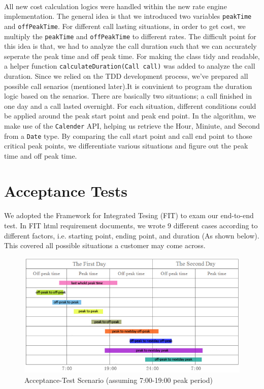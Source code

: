 \documentclass[a4paper,12pt,oneside,final]{article}
\newenvironment{changemargin}[2]{\begin{list}{}{%
\setlength{\topsep}{0pt}%
\setlength{\leftmargin}{0pt}%
\setlength{\rightmargin}{0pt}%
\setlength{\listparindent}{\parindent}%
\setlength{\itemindent}{\parindent}%
\setlength{\parsep}{0pt plus 1pt}%
\addtolength{\leftmargin}{#1}%
\addtolength{\rightmargin}{#2}%
}\item }{\end{list}}
\begin{document}
\paragraph{}
All new cost calculation logics were handled within the new rate engine implementation. The general idea is that we introduced two variables \verb+peakTime+ and \verb+offPeakTime+. For different call lasting situations, in order to get cost, we multiply the \verb+peakTime+ and \verb+offPeakTime+ to different rates. The difficult point for this idea is that, we had to analyze the call duration such that we can accurately seperate  the peak time and off peak time. For making the class tidy and readable, a helper function \verb+calculateDuration(Call call)+ was added to analyze the call duration. Since we relied on the TDD development process, we've prepared all possible call senarios (mentioned later).It is convinient to program the duration logic based on the senarios. There are basically two situations; a call finished in one day and a call lasted overnight. For each situation, different conditions could be applied around the peak start point and peak end point. In the algorithm, we make use of the \verb+Calender+ API, helping us retrieve the Hour, Miniute, and Second from a \verb+Date+ type.  By comparing the call start point and call end point to those critical peak points, we differentiate various situations and figure out the peak time and off peak time.


\section{Acceptance Tests} %
\paragraph{}
We adopted the Framework for Integrated Tesing (FIT) to exam our end-to-end test. In FIT html requirement documents, we wrote 9 different cases according to different factors, i.e. starting point, ending point, and duration (As shown below). This covered all possible situations a customer may come across.
\begin{figure}[!h]
\begin{changemargin}{-20mm}{-20mm}
\center
\includegraphics[scale=0.70]{fit-cases.png}
\caption{Acceptance-Test Scenario (assuming 7:00-19:00 peak period)}
\end{changemargin}
\end{figure}
\end{document}
